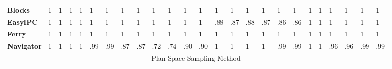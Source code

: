 \documentclass[doctor]{thesis} %
\theoremstyle{plain}
\begin{document}
\begin{table}[tb]
{\begin{tabular}{|l|llllll|llllll|llllll|llllll|}
\textbf{Blocks}              & 1                       & \multicolumn{1}{l|}{1}   & 1                       & \multicolumn{1}{l|}{1}   & 1                       & 1     & 1                       & \multicolumn{1}{l|}{1}   & 1                       & \multicolumn{1}{l|}{1}   & 1                       & 1   & 1                       & \multicolumn{1}{l|}{1}   & 1                       & \multicolumn{1}{l|}{1}   & 1                       & 1   & 1                       & \multicolumn{1}{l|}{1}    & 1                       & \multicolumn{1}{l|}{1}    & 1                       & 1    \\ \cline{1-1}
\textbf{EasyIPC}             & 1                       & \multicolumn{1}{l|}{1}   & 1                       & \multicolumn{1}{l|}{1}   & 1                       & 1     & 1                       & \multicolumn{1}{l|}{1}   & 1                       & \multicolumn{1}{l|}{1}   & 1                       & 1   & .88                     & \multicolumn{1}{l|}{.87} & .88                     & \multicolumn{1}{l|}{.87} & .86                     & .86 & 1                       & \multicolumn{1}{l|}{1}    & 1                       & \multicolumn{1}{l|}{1}    & 1                       & 1    \\ \cline{1-1}
\textbf{Ferry}               & 1                       & \multicolumn{1}{l|}{1}   & 1                       & \multicolumn{1}{l|}{1}   & 1                       & 1     & 1                       & \multicolumn{1}{l|}{1}   & 1                       & \multicolumn{1}{l|}{1}   & 1                       & 1   & 1                       & \multicolumn{1}{l|}{1}   & 1                       & \multicolumn{1}{l|}{1}   & 1                       & 1   & 1                       & \multicolumn{1}{l|}{1}    & 1                       & \multicolumn{1}{l|}{1}    & 1                       & 1    \\ \cline{1-1}
\textbf{Navigator}           & 1                       & \multicolumn{1}{l|}{1}   & 1                       & \multicolumn{1}{l|}{1}   & .99                     & .99   & .87                     & \multicolumn{1}{l|}{.87} & .72                     & \multicolumn{1}{l|}{.74} & .90                     & .90 & 1                       & \multicolumn{1}{l|}{1}   & 1                       & \multicolumn{1}{l|}{1}   & .99                     & .99 & 1                       & \multicolumn{1}{l|}{1}    & .96                     & \multicolumn{1}{l|}{.96}  & .99                     & .99  \\ \hline
\multicolumn{25}{|c|}{Plan Space Sampling Method}                                                                                                                                                                                                                                                                                                                                                                                                                                                                                                                                                                                      \\ \hline

\end{tabular}}
\end{table}
\end{document}
